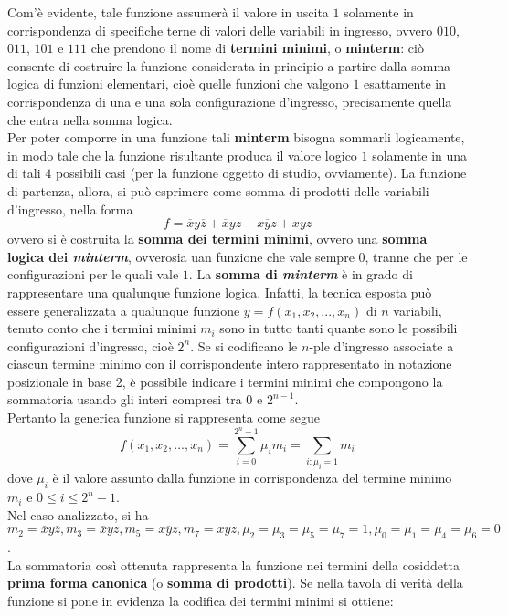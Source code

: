 \documentclass[a4paper]{extarticle}
\begin{document}
\noindent
Com'è evidente, tale funzione assumerà il valore in uscita \(1\) solamente in corrispondenza di specifiche terne di valori delle variabili in ingresso, ovvero \(010\), \(011\), \(101\) e \(111\) che prendono il nome di \textbf{termini minimi}, o \textbf{minterm}: ciò consente di costruire la funzione considerata in principio a partire dalla somma logica di funzioni elementari, cioè quelle funzioni che valgono \(1\) esattamente in corrispondenza di una e una sola configurazione d’ingresso, precisamente quella che entra nella somma logica.\\
Per poter comporre in una funzione tali \textbf{minterm} bisogna sommarli logicamente, in modo tale che la funzione risultante produca il valore logico \(1\) solamente in una di tali \(4\) possibili casi (per la funzione oggetto di studio, ovviamente). La funzione di partenza, allora, si può esprimere come somma di prodotti delle variabili d’ingresso, nella forma
\[f = \overline{x}y\overline{z} + \overline{x}yz + x\overline{y}z + xyz\]
ovvero si è costruita la \textbf{somma dei termini minimi}, ovvero una \textbf{somma logica dei \textit{minterm}}, ovverosia uan funzione che vale sempre \(0\), tranne che per le configurazioni per le quali vale \(1\). La \textbf{somma di \textit{minterm}} è in grado di rappresentare una qualunque funzione logica. Infatti, la tecnica esposta può essere generalizzata a qualunque funzione \(y = f(x_1, x_2, ..., x_n)\)
di \(n\) variabili, tenuto conto che i termini minimi \(m_i\) sono in tutto tanti quante sono le possibili configurazioni
d’ingresso, cioè \(2^n\). Se si codificano le $n$-ple d’ingresso associate a ciascun termine minimo con il corrispondente
intero rappresentato in notazione posizionale in base 2, è possibile indicare i termini minimi che compongono la
sommatoria usando gli interi compresi tra \(0\) e \(2^{n-1}\).\\
Pertanto la generica funzione si rappresenta come segue
\[f(x_1, x_2, ..., x_n) = \underset{i = 0}{\overset{2^n - 1}{\sum}} \mu_i m_i = \underset{i: \mu_i = 1}{\sum} m_i\]
dove \(\mu_i\) è il valore assunto dalla funzione in corrispondenza del termine minimo \(m_i\) e \(0 \leq i \leq 2^n -1\).\\
Nel caso analizzato, si ha \(m_2 = \overline{x}y\overline{z}, m_3 = \overline{x}yz, m_5 = x\overline{y}z, m_7 = xyz, \mu_2 = \mu_3 = \mu_5 = \mu_7 = 1, \mu_0 = \mu_1 = \mu_4 = \mu_6 = 0\).\\
La sommatoria così ottenuta rappresenta la funzione nei termini della cosiddetta \textbf{prima forma canonica} (o \textbf{somma di prodotti}). Se nella tavola di verità della funzione si pone in evidenza la codifica dei termini minimi si ottiene:
\end{document}
